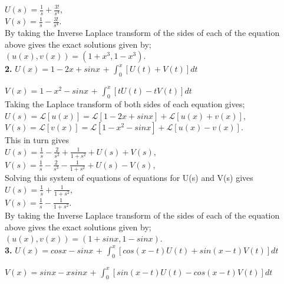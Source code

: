 \documentclass[12pt]{article}
\begin{document}
{$U(s) = \frac{1}{s} + \frac{3!}{s^4}$,\\

$V(s) = \frac{1}{s} - \frac{3!}{s^4}$.\\

By taking the Inverse Laplace transform of the sides of each of the equation above gives the exact solutions given by;\\

$(u(x), v(x)) = (1 + x^3, 1 - x^3)$.\\

\textbf{2.} $U(x) = 1 - 2x + sinx$ + \(\int_{0}^{x} [U(t) + V(t)]dt\)\\
\par$V(x) = 1 - x^2 - sinx$ + \(\int_{0}^{x} [tU(t) - tV(t)]dt\)\\

 Taking the Laplace transform of both sides of each equation gives;\\

$U(s) = \mathcal{L}[u(x)] = \mathcal{L}[1 - 2x + sinx] + \mathcal{L}[u(x) + v(x)]$,\\

$V(s) = \mathcal{L}[v(x)] = \mathcal{L}[1 - x^2 - sinx] + \mathcal{L}[u(x) - v(x)]$.\\

This in turn gives\\

$U(s) = \frac{1}{s} - \frac{2}{s^2} + \frac{1}{1 + s^2} + U(s) + V(s)$,\\

$V(s) = \frac{1}{s} - \frac{2}{s^3} - \frac{1}{1 + s^2} + U(s) - V(s)$,\\

Solving this system of equations of equations for U(s) and V(s) gives\\

$U(s) = \frac{1}{s} + \frac{1}{1 + s^2}$,\\

$V(s) = \frac{1}{s} - \frac{1}{1 + s^2}$.\\

By taking the Inverse Laplace transform of the sides of each of the equation above gives the exact solutions given by;\\

$(u(x), v(x)) =(1 + sinx, 1 - sinx)$.\\

\textbf{3.} $U(x) = cosx - sinx$ + \(\int_{0}^{x} [cos(x - t)U(t) + sin(x - t)V(t)]dt\)\\
\par$V(x) =  sinx - xsinx$ + \(\int_{0}^{x} [sin(x - t)U(t) - cos(x - t)V(t)]dt\)\\

}
\end{document}
